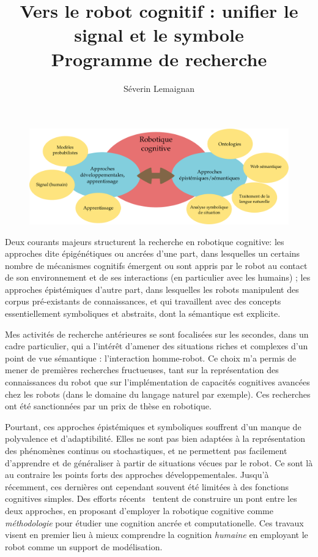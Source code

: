 \documentclass[a4paper]{article}
\title{Vers le robot cognitif : unifier le signal et le symbole\\ 
    {\large Programme de recherche}}
\author{Séverin Lemaignan}
\date{}
\begin{document}
\maketitle

\begin{figure}
    \centering
    \includegraphics[width=1.0\linewidth]{place}
    \caption{}
    \label{place}
\end{figure}


Deux courants majeurs structurent la recherche en robotique cognitive:
les approches dite épigénétiques ou ancrées d'une part, dans lesquelles
un certains nombre de mécanismes cognitifs émergent ou sont appris par le robot
au contact de son environnement et de ses interactions (en particulier avec les
humains) ; les approches épistémiques d'autre part, dans lesquelles les robots
manipulent des corpus pré-existants de connaissances, et qui travaillent avec des
concepts essentiellement symboliques et abstraits, dont la sémantique est explicite.

Mes activités de recherche antérieures se sont focalisées sur les secondes, dans
un cadre particulier, qui a l'intérêt d'amener des situations riches et complexes
d'un point de vue sémantique : l'interaction homme-robot. Ce choix m'a permis de
mener de premières recherches fructueuses, tant sur la représentation des
connaissances du robot que sur l'implémentation de capacités cognitives
avancées chez les robots (dans le domaine du langage naturel par exemple). Ces
recherches ont été sanctionnées par un prix de thèse en robotique.

Pourtant, ces approches épistémiques et symboliques souffrent d'un manque de
polyvalence et d'adaptibilité. Elles ne sont pas bien adaptées à la
représentation des phénomènes continus ou stochastiques, et ne permettent pas
facilement d'apprendre et de généraliser à partir de situations vécues par le
robot. Ce sont là au contraire les points forts des approches développementales.
Jusqu'à récemment, ces dernières ont cependant souvent été limitées à des
fonctions cognitives simples. Des efforts récents~\cite{morse2010epigenetic,
pezzulo2012computational} tentent de construire un pont entre les deux
approches, en proposant d'employer la robotique cognitive comme
\emph{méthodologie} pour étudier une cognition ancrée et computationelle. Ces
travaux visent en premier lieu à mieux comprendre la cognition \emph{humaine} en
employant le robot comme un support de modélisation.
\end{document}
